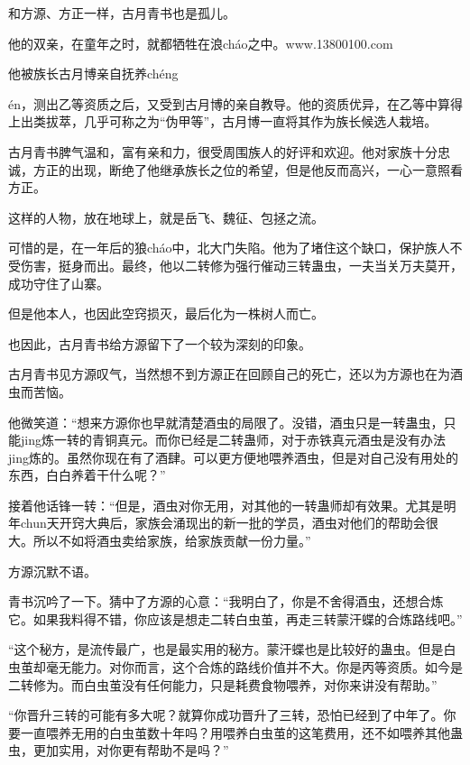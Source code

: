 
\begin{this_body}

和方源、方正一样，古月青书也是孤儿。

他的双亲，在童年之时，就都牺牲在浪cháo之中。www.13800100.com

他被族长古月博亲自抚养chéng

én，测出乙等资质之后，又受到古月博的亲自教导。他的资质优异，在乙等中算得上出类拔萃，几乎可称之为“伪甲等”，古月博一直将其作为族长候选人栽培。

古月青书脾气温和，富有亲和力，很受周围族人的好评和欢迎。他对家族十分忠诚，方正的出现，断绝了他继承族长之位的希望，但是他反而高兴，一心一意照看方正。

这样的人物，放在地球上，就是岳飞、魏征、包拯之流。

可惜的是，在一年后的狼cháo中，北大门失陷。他为了堵住这个缺口，保护族人不受伤害，挺身而出。最终，他以二转修为强行催动三转蛊虫，一夫当关万夫莫开，成功守住了山寨。

但是他本人，也因此空窍损灭，最后化为一株树人而亡。

也因此，古月青书给方源留下了一个较为深刻的印象。

古月青书见方源叹气，当然想不到方源正在回顾自己的死亡，还以为方源也在为酒虫而苦恼。

他微笑道：“想来方源你也早就清楚酒虫的局限了。没错，酒虫只是一转蛊虫，只能jing炼一转的青铜真元。而你已经是二转蛊师，对于赤铁真元酒虫是没有办法jing炼的。虽然你现在有了酒肆。可以更方便地喂养酒虫，但是对自己没有用处的东西，白白养着干什么呢？”

接着他话锋一转：“但是，酒虫对你无用，对其他的一转蛊师却有效果。尤其是明年chun天开窍大典后，家族会涌现出的新一批的学员，酒虫对他们的帮助会很大。所以不如将酒虫卖给家族，给家族贡献一份力量。”

方源沉默不语。

青书沉吟了一下。猜中了方源的心意：“我明白了，你是不舍得酒虫，还想合炼它。如果我料得不错，你应该是想走二转白虫茧，再走三转蒙汗蝶的合炼路线吧。”

“这个秘方，是流传最广，也是最实用的秘方。蒙汗蝶也是比较好的蛊虫。但是白虫茧却毫无能力。对你而言，这个合炼的路线价值并不大。你是丙等资质。如今是二转修为。而白虫茧没有任何能力，只是耗费食物喂养，对你来讲没有帮助。”

“你晋升三转的可能有多大呢？就算你成功晋升了三转，恐怕已经到了中年了。你要一直喂养无用的白虫茧数十年吗？用喂养白虫茧的这笔费用，还不如喂养其他蛊虫，更加实用，对你更有帮助不是吗？”


\end{this_body}
